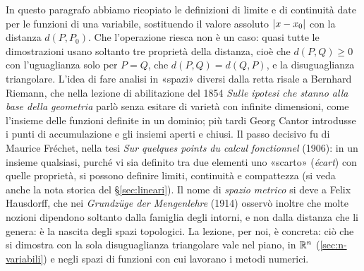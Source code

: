 \begin{notastorica}
In questo paragrafo abbiamo ricopiato le definizioni di limite e di continuità date per
le funzioni di una variabile, sostituendo il valore assoluto $\lvert x-x_{0}\rvert$ con la
distanza $d(P,P_{0})$. Che l'operazione riesca non è un caso: quasi tutte le
dimostrazioni usano soltanto tre proprietà della distanza, cioè che $d(P,Q)\ge0$ con
l'uguaglianza solo per $P=Q$, che $d(P,Q)=d(Q,P)$, e la disuguaglianza triangolare.
L'idea di fare analisi in «spazi» diversi dalla retta risale a Bernhard Riemann, che
nella lezione di abilitazione del 1854 \emph{Sulle ipotesi che stanno alla base della
geometria} parlò senza esitare di varietà con infinite dimensioni, come l'insieme delle
funzioni definite in un dominio; più tardi Georg Cantor introdusse i punti di
accumulazione e gli insiemi aperti e chiusi. Il passo decisivo fu di
Maurice Fréchet, nella tesi \emph{Sur quelques points du calcul fonctionnel} (1906): in
un insieme qualsiasi, purché vi sia definito tra due elementi uno «scarto»
(\emph{écart}) con quelle proprietà, si possono definire limiti, continuità e
compattezza (si veda anche la nota storica del \S\ref{sec:lineari}). Il nome di
\emph{spazio metrico} si deve a Felix Hausdorff, che nei \emph{Grundzüge der
Mengenlehre} (1914) osservò inoltre che molte nozioni dipendono soltanto dalla famiglia
degli intorni, e non dalla distanza che li genera: è la nascita degli spazi topologici.
La lezione, per noi, è concreta: ciò che si dimostra con la sola disuguaglianza
triangolare vale nel piano, in $\mathbb{R}^{n}$ (\cref{sec:n-variabili}) e negli spazi di
funzioni con cui lavorano i metodi numerici.
\end{notastorica}
